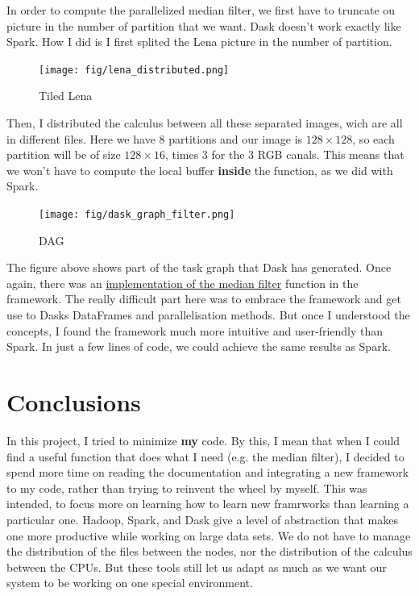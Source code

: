 \documentclass[10pt,twocolumn,letterpaper]{article}
\begin{document}
    In order to compute the parallelized median filter, we first have to
truncate ou picture in the number of partition that we want. Dask doesn't work
exactly like Spark. How I did is I first splited the Lena picture in the number
of partition.

    \begin{figure}[H]
          \centering
          \caption{Tiled Lena}
        \texttt{[image: fig/lena\_distributed.png]}
    \end{figure}

Then, I distributed the calculus between all these separated images, wich are
all in different files. Here we have 8 partitions and our image is $128\times
128$, so each partition will be of size $128\times 16$, times 3 for the 3 RGB
canals. This means that we won't have to compute the local buffer
\textbf{inside} the function, as we did with Spark.

    \begin{figure}[H]
        \centering
        \caption{DAG}
    \texttt{[image: fig/dask\_graph\_filter.png]}
    \end{figure}

    The figure above shows part of the task graph that Dask has generated. Once
again, there was an
\href{}{implementation of the median filter}
function in the framework. The really difficult part here was to embrace the
framework and get use to Dasks DataFrames and parallelisation methods. But once
I understood the concepts, I found the framework much more intuitive and
user-friendly than Spark. In just a few lines of code, we could achieve the same
results as Spark.
\section*{Conclusions}

In this project, I tried to minimize \textbf{my} code. By this, I mean that
when I could find a useful function that does what I need (e.g. the median
filter), I decided to spend more time on reading the documentation and
integrating a new framework to my code, rather than trying to reinvent the wheel
by myself. This was intended, to focus more on learning how to learn new
framrworks than learning a particular one. Hadoop, Spark, and Dask give a level
of abstraction that makes one more productive while working on large data sets.
We do not have to manage the distribution of the files between the nodes, nor
the distribution of the calculus between the CPUs. But these tools still let us
adapt as much as we want our system to be working on one special environment. 
\end{document}

